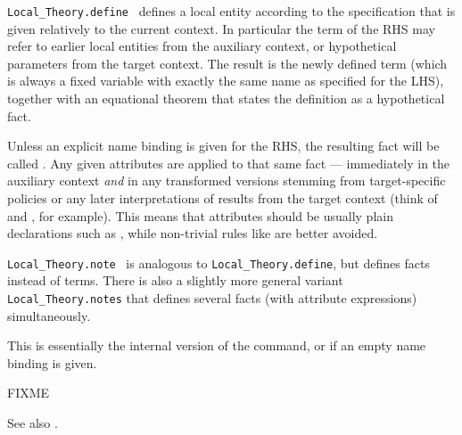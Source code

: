 \begin{isabellebody}
\begin{isamarkuptext}
\begin{description}
  \item \verb|Local_Theory.define|~ defines a local entity according to the specification that is
  given relatively to the current  context.  In
  particular the term of the RHS may refer to earlier local entities
  from the auxiliary context, or hypothetical parameters from the
  target context.  The result is the newly defined term (which is
  always a fixed variable with exactly the same name as specified for
  the LHS), together with an equational theorem that states the
  definition as a hypothetical fact.

  Unless an explicit name binding is given for the RHS, the resulting
  fact will be called .  Any given attributes are
  applied to that same fact --- immediately in the auxiliary context
  \emph{and} in any transformed versions stemming from target-specific
  policies or any later interpretations of results from the target
  context (think of \hyperlink{command.locale}{\mbox{}} and \hyperlink{command.interpretation}{\mbox{}},
  for example).  This means that attributes should be usually plain
  declarations such as \hyperlink{attribute.simp}{\mbox{}}, while non-trivial rules like
  \hyperlink{attribute.simplified}{\mbox{}} are better avoided.

  \item \verb|Local_Theory.note|~ is
  analogous to \verb|Local_Theory.define|, but defines facts instead of
  terms.  There is also a slightly more general variant \verb|Local_Theory.notes| that defines several facts (with attribute
  expressions) simultaneously.

  This is essentially the internal version of the \hyperlink{command.lemmas}{\mbox{}}
  command, or \hyperlink{command.declare}{\mbox{}} if an empty name binding is given.

  \end{description}%
\end{isamarkuptext}%
\isamarkuptrue%
%
\endisatagmlref
{\isafoldmlref}%
%
\isadelimmlref
%
\endisadelimmlref
%
\isamarkuptrue%
%
\begin{isamarkuptext}%
FIXME

  \medskip See also \cite{Chaieb-Wenzel:2007}.%
\end{isamarkuptext}%
\isamarkuptrue%
%
\isadelimtheory
%
\endisadelimtheory
%
\isatagtheory
{}\isamarkupfalse%
%
\endisatagtheory
{\isafoldtheory}%
%
\isadelimtheory
%
\endisadelimtheory
\isanewline
\end{isabellebody}%
